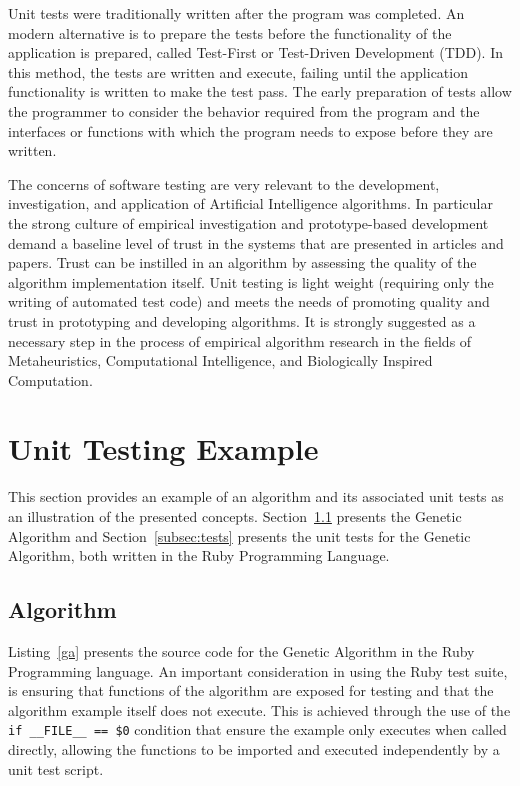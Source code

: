 \documentclass[a4paper, 11pt]{article}
\begin{document}
Unit tests were traditionally written after the program was completed. An modern alternative is to prepare the tests before the functionality of the application is prepared, called Test-First or Test-Driven Development (TDD). In this method, the tests are written and execute, failing until the application functionality is written to make the test pass. The early preparation of tests allow the programmer to consider the behavior required from the program and the interfaces or functions with which the program needs to expose before they are written. 

The concerns of software testing are very relevant to the development, investigation, and application of Artificial Intelligence algorithms. In particular the strong culture of empirical investigation and prototype-based development demand a baseline level of trust in the systems that are presented in articles and papers. Trust can be instilled in an algorithm by assessing the quality of the algorithm implementation itself. 
Unit testing is light weight (requiring only the writing of automated test code) and meets the needs of promoting quality and trust in prototyping and developing algorithms. It is strongly suggested as a necessary step in the process of empirical algorithm research in the fields of Metaheuristics, Computational Intelligence, and Biologically Inspired Computation.

%
%
\section{Unit Testing Example}
\label{sec:example}
This section provides an example of an algorithm and its associated unit tests as an illustration of the presented concepts. Section~\ref{subsec:algorithm} presents the Genetic Algorithm and Section~\ref{subsec:tests} presents the unit tests for the Genetic Algorithm, both written in the Ruby Programming Language.

\subsection{Algorithm}
\label{subsec:algorithm}
Listing~\ref{ga} presents the source code for the Genetic Algorithm in the Ruby Programming language. An important consideration in using the Ruby test suite, is ensuring that functions of the algorithm are exposed for testing and that the algorithm example itself does not execute. This is achieved through the use of the \texttt{if \_\_FILE\_\_ == \$0} condition that ensure the example only executes when called directly, allowing the functions to be imported and executed independently by a unit test script.
\end{document}
